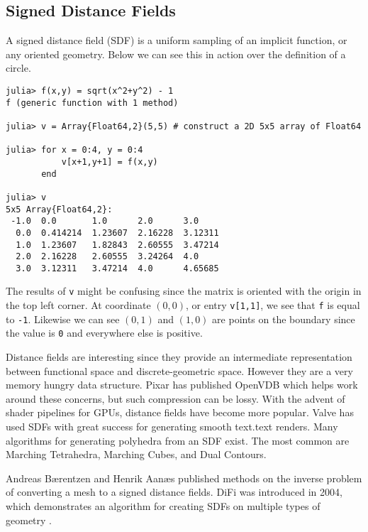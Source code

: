 \subsection{Signed Distance Fields}


A signed distance field (SDF) is a uniform sampling of an implicit function,
or any oriented geometry. 
Below
we can see this in action over the definition of a circle.

\begin{lstlisting}
julia> f(x,y) = sqrt(x^2+y^2) - 1
f (generic function with 1 method)

julia> v = Array{Float64,2}(5,5) # construct a 2D 5x5 array of Float64

julia> for x = 0:4, y = 0:4
           v[x+1,y+1] = f(x,y)
       end

julia> v
5x5 Array{Float64,2}:
 -1.0  0.0       1.0      2.0      3.0    
  0.0  0.414214  1.23607  2.16228  3.12311
  1.0  1.23607   1.82843  2.60555  3.47214
  2.0  2.16228   2.60555  3.24264  4.0    
  3.0  3.12311   3.47214  4.0      4.65685
\end{lstlisting}

The results of \texttt{v} might be confusing since the matrix is oriented with
the origin in the top left corner. At coordinate $(0,0)$, or entry \texttt{v[1,1]},
we see that \texttt{f} is
equal to \texttt{-1}. Likewise we can see $(0,1)$ and $(1,0)$ are points on
the boundary since the value is \texttt{0} and everywhere else is positive.

Distance fields are interesting since they provide an intermediate representation
between functional space and discrete-geometric space. However they are
a very memory hungry data structure. Pixar has published OpenVDB which helps
work around these concerns, but such compression can be lossy.\cite{OpenVDB}
With the advent of shader pipelines for GPUs, distance fields have become
more popular. Valve has used SDFs with great success for generating smooth
text.text renders. \cite{Green_2007}
Many algorithms for generating polyhedra from an SDF
exist. The most common are Marching Tetrahedra, Marching Cubes,
and Dual Contours.\cite{Muller_Wehle_1997}\cite{Newman_Yi_2006}\cite{Cook_Hourvitz}


Andreas Bærentzen and Henrik Aanæs published methods on the inverse
problem of converting a mesh to a signed distance fields.\cite{Baerentzen_Aanaes}
DiFi was introduced in 2004, which demonstrates an algorithm for creating
SDFs on multiple types of geometry \cite{Sud_Otaduy_Manocha_2004}.

